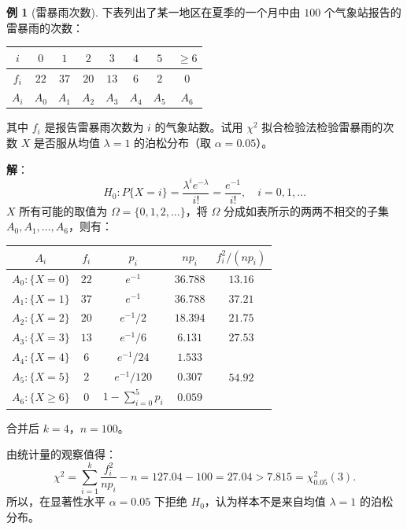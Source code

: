 \documentclass[11pt,a4paper]{report}
\theoremstyle{definition}
\newtheorem{example}{例}[chapter]
\begin{document}
\begin{example}[雷暴雨次数]
下表列出了某一地区在夏季的一个月中由 $100$ 个气象站报告的雷暴雨的次数：

\begin{table}[htbp]
\centering
\begin{tabular}{@{}cccccccc@{}}
\toprule
$i$ & $0$ & $1$ & $2$ & $3$ & $4$ & $5$ & $\geq 6$ \\
\midrule
$f_{i}$ & $22$ & $37$ & $20$ & $13$ & $6$ & $2$ & $0$ \\
$A_{i}$ & $A_{0}$ & $A_{1}$ & $A_{2}$ & $A_{3}$ & $A_{4}$ & $A_{5}$ & $A_{6}$ \\
\bottomrule
\end{tabular}
\end{table}

其中 $f_{i}$ 是报告雷暴雨次数为 $i$ 的气象站数。试用 $\chi^{2}$ 拟合检验法检验雷暴雨的次数 $X$ 是否服从均值 $\lambda=1$ 的泊松分布（取 $\alpha=0.05$）。

\textbf{解}：
\[
H_{0}\colon P\{X=i\}=\frac{\lambda^{i}e^{-\lambda}}{i!}=\frac{e^{-1}}{i!},\quad i=0,1,\ldots
\]
$X$ 所有可能的取值为 $\Omega=\{0,1,2,\ldots\}$，将 $\Omega$ 分成如表所示的两两不相交的子集 $A_{0},A_{1},\ldots,A_{6}$，则有：

\begin{table}[htbp]
\centering
\begin{tabular}{@{}ccccc@{}}
\toprule
$A_{i}$ & $f_{i}$ & $p_{i}$ & $np_{i}$ & $f_{i}^{2}/(np_{i})$ \\
\midrule
$A_{0}\colon\{X=0\}$ & $22$ & $e^{-1}$ & $36.788$ & $13.16$ \\
$A_{1}\colon\{X=1\}$ & $37$ & $e^{-1}$ & $36.788$ & $37.21$ \\
$A_{2}\colon\{X=2\}$ & $20$ & $e^{-1}/2$ & $18.394$ & $21.75$ \\
$A_{3}\colon\{X=3\}$ & $13$ & $e^{-1}/6$ & $6.131$ & $27.53$ \\
$A_{4}\colon\{X=4\}$ & $6$ & $e^{-1}/24$ & $1.533$ & \multirow{3}{*}{$54.92$} \\
$A_{5}\colon\{X=5\}$ & $2$ & $e^{-1}/120$ & $0.307$ & \\
$A_{6}\colon\{X\geq 6\}$ & $0$ & $1-\sum_{i=0}^{5}p_{i}$ & $0.059$ & \\
\bottomrule
\end{tabular}
\end{table}

合并后 $k=4$，$n=100$。

由统计量的观察值得：
\[
\chi^{2}=\sum_{i=1}^{k}\frac{f_{i}^{2}}{np_{i}}-n=127.04-100=27.04>7.815=\chi_{0.05}^{2}(3).
\]
所以，在显著性水平 $\alpha=0.05$ 下拒绝 $H_{0}$，认为样本不是来自均值 $\lambda=1$ 的泊松分布。
\end{example}
\end{document}
